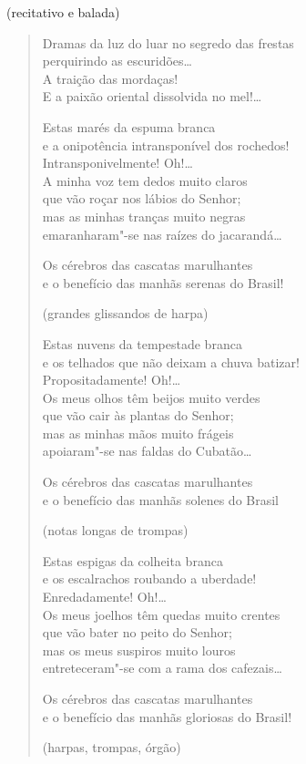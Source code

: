 \begin{flushright}
{\small(recitativo e balada)}
\end{flushright}

\begin{verse}
Dramas da luz do luar no segredo das frestas\\
perquirindo as escuridões\ldots{}\\
A traição das mordaças!\\
E a paixão oriental dissolvida no mel!\ldots{}

Estas marés da espuma branca\\
e a onipotência intransponível dos rochedos!\\
Intransponivelmente! Oh!\ldots{}\\
A minha voz tem dedos muito claros\\
que vão roçar nos lábios do Senhor;\\
mas as minhas tranças muito negras\\
emaranharam"-se nas raízes do jacarandá\ldots{}

Os cérebros das cascatas marulhantes\\
e o benefício das manhãs serenas do Brasil!

\hfill{}{\small(grandes glissandos de harpa)}

Estas nuvens da tempestade branca\\
e os telhados que não deixam a chuva batizar!\\
Propositadamente! Oh!\ldots{}\\
Os meus olhos têm beijos muito verdes\\
que vão cair às plantas do Senhor;\\
mas as minhas mãos muito frágeis\\
apoiaram"-se nas faldas do Cubatão\ldots{}

Os cérebros das cascatas marulhantes\\
e o benefício das manhãs solenes do Brasil

\hfill{}{\small(notas longas de trompas)}

Estas espigas da colheita branca\\
e os escalrachos roubando a uberdade!\\
Enredadamente! Oh!\ldots{}\\
Os meus joelhos têm quedas muito crentes\\
que vão bater no peito do Senhor;\\
mas os meus suspiros muito louros\\
entreteceram"-se com a rama dos cafezais\ldots{}

Os cérebros das cascatas marulhantes\\
e o benefício das manhãs gloriosas do Brasil!

\hfill{}{\small(harpas, trompas, órgão)}
\end{verse}

